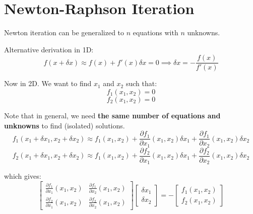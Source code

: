 \documentclass{article}
\newenvironment{remark}
	{\definecolor{shadethmcolor}{HTML}{DFD4FF}\definecolor{shaderulecolor}{HTML}{713DFF}\setlength{\shadeboxrule}{.4pt}\begin{protoremark}\normalfont}
	{\end{protoremark}}
\begin{document}
\section*{Newton-Raphson Iteration}
\begin{remark}
Newton iteration can be generalized to $n$ equations with $n$ unknowns. 

Alternative derivation in 1D:
\[
f(x+\delta x)\approx f(x) + f'(x)\delta x = 0\implies\delta x = -\frac{f(x)}{f'(x)}
\]

Now in 2D. We want to find $x_1$ and $x_2$ such that: 
\[
f_1(x_1, x_2)=0
\]\[
f_2(x_1, x_2)=0
\]

Note that in general, we need \textbf{the same number of equations and unknowns} to find (isolated) solutions.
\[
f_1(x_1 + \delta x_1, x_2 + \delta x_2) \approx f_1(x_1, x_2) + \frac{\partial f_1}{\partial x_1}(x_1, x_2)\delta x_1 + \frac{\partial f_1}{\partial x_2}(x_1, x_2)\delta x_2
\]\[
f_2(x_1+\delta x_1, x_2+\delta x_2)\approx f_1(x_1,x_2)+\frac{\partial f_2}{\partial x_1}(x_1,x_2)\delta x_1 + \frac{\partial f_2}{\partial x_2}(x_1, x_2)\delta x_2
\]

which gives:
\[
\begin{bmatrix}
\frac{\partial f_1}{\partial x_1}(x_1, x_2) & \frac{\partial f_1}{\partial x_2}(x_1, x_2) \\
\frac{\partial f_2}{\partial x_1}(x_1, x_2) & \frac{\partial f_2}{\partial x_2}(x_1, x_2) 
\end{bmatrix}
\begin{bmatrix}
\delta x_1 \\
\delta x_2
\end{bmatrix}
=-
\begin{bmatrix}
f_1(x_1, x_2) \\
f_2(x_1, x_2) 
\end{bmatrix}
\]
\end{remark}
\end{document}
